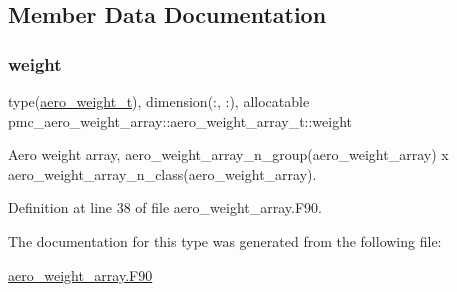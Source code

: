 \subsection{Member Data Documentation}
\mbox{\label{structpmc__aero__weight__array_1_1aero__weight__array__t_ad521ea7fd52fa87d57f8f71c2d223e08}} 
\subsubsection{\texorpdfstring{weight}{weight}}
{\footnotesize\ttfamily type(\mbox{\hyperlink{structpmc__aero__weight_1_1aero__weight__t}{aero\+\_\+weight\+\_\+t}}), dimension(\+:, \+:), allocatable pmc\+\_\+aero\+\_\+weight\+\_\+array\+::aero\+\_\+weight\+\_\+array\+\_\+t\+::weight}



Aero weight array, {\ttfamily aero\+\_\+weight\+\_\+array\+\_\+n\+\_\+group(aero\+\_\+weight\+\_\+array) x aero\+\_\+weight\+\_\+array\+\_\+n\+\_\+class(aero\+\_\+weight\+\_\+array)}. 



Definition at line 38 of file aero\+\_\+weight\+\_\+array.\+F90.



The documentation for this type was generated from the following file\+:\begin{DoxyCompactItemize}
\item 
\mbox{\hyperlink{aero__weight__array_8_f90}{aero\+\_\+weight\+\_\+array.\+F90}}\end{DoxyCompactItemize}
